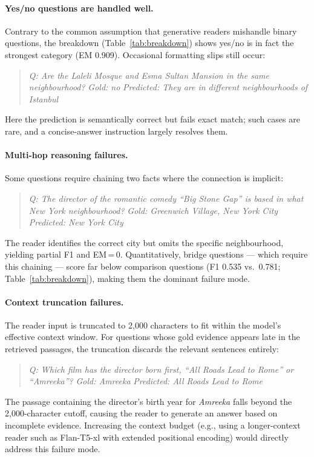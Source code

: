 \documentclass{llncs}
\begin{document}
\paragraph{Yes/no questions are handled well.}
Contrary to the common assumption that generative readers mishandle binary
questions, the breakdown (Table~\ref{tab:breakdown}) shows yes/no is in fact the
strongest category (EM 0.909). Occasional formatting slips still occur:
\begin{quote}
\small
\textit{Q: Are the Laleli Mosque and Esma Sultan Mansion in the same
neighbourhood?} \quad
\textit{Gold: no} \quad \textit{Predicted: They are in different
neighbourhoods of Istanbul}
\end{quote}
Here the prediction is semantically correct but fails exact match; such cases
are rare, and a concise-answer instruction largely resolves them.

\paragraph{Multi-hop reasoning failures.}
Some questions require chaining two facts where the connection is implicit:
\begin{quote}
\small
\textit{Q: The director of the romantic comedy ``Big Stone Gap'' is based in
what New York neighbourhood?} \quad
\textit{Gold: Greenwich Village, New York City} \quad
\textit{Predicted: New York City}
\end{quote}
The reader identifies the correct city but omits the specific neighbourhood,
yielding partial F1 and EM\,=\,0. Quantitatively, bridge questions --- which
require this chaining --- score far below comparison questions (F1 0.535
vs.\ 0.781; Table~\ref{tab:breakdown}), making them the dominant failure mode.

\paragraph{Context truncation failures.}
The reader input is truncated to 2{,}000 characters to fit within the
model's effective context window. For questions whose gold evidence
appears late in the retrieved passages, the truncation discards the
relevant sentences entirely:
\begin{quote}
\small
\textit{Q: Which film has the director born first, ``All Roads Lead to Rome''
or ``Amreeka''?} \quad
\textit{Gold: Amreeka} \quad \textit{Predicted: All Roads Lead to Rome}
\end{quote}
The passage containing the director's birth year for \textit{Amreeka}
falls beyond the 2{,}000-character cutoff, causing the reader to generate
an answer based on incomplete evidence. Increasing the context budget
(e.g., using a longer-context reader such as Flan-T5-xl with extended
positional encoding) would directly address this failure mode.
\end{document}
